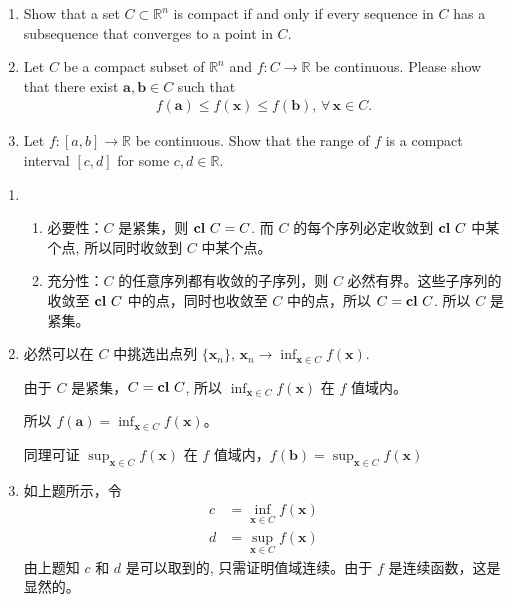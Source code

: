 \documentclass[11pt,letter,notitlepage]{article}
\theoremstyle{definition}
\DeclareMathOperator*{\cl}{\bf cl\,}
\begin{document}
\begin{exercise}
	\begin{enumerate}
		\item Show that a set $C \subset \mathbb{R}^n$ is compact if and only if every sequence in $C$ has a subsequence that converges to a point in $C$.
		\item Let $C$ be a compact subset of $\mathbb{R}^n$ and $f:C \rightarrow \mathbb{R}$ be continuous. Please show that there exist $\mathbf{a},\mathbf{b} \in C$ such that
		      \begin{align*}
			      f(\mathbf{a}) \leq f(\mathbf{x}) \leq f(\mathbf{b}),\,\forall\,\mathbf{x}\in C.
		      \end{align*}
		\item Let $f: \left[ a,b \right] \rightarrow\mathbb{R}$ be continuous. Show that the range of $f$ is a compact interval $\left[c,d \right]$ for some $c,d \in \mathbb{R}$.
	\end{enumerate}
\end{exercise}
\begin{solution}
	\begin{enumerate}
		\item \begin{enumerate}
			      \item 必要性：$C$ 是紧集，则 $\cl C=C$. 而 $C$ 的每个序列必定收敛到 $\cl C$ 中某个点, 所以同时收敛到 $C$ 中某个点。
			      \item 充分性：$C$ 的任意序列都有收敛的子序列，则 $C$ 必然有界。这些子序列的收敛至 $\cl C$ 中的点，同时也收敛至 $C$ 中的点，所以 $C=\cl C$. 所以 $C$ 是紧集。
		      \end{enumerate}
		\item 必然可以在 $C$ 中挑选出点列 $\{\mathbf{x}_n\}$, $\mathbf{x}_n\to\inf_{\mathbf{x}\in C} f(\mathbf{x})$.

		      由于 $C$ 是紧集，$C=\cl C$, 所以 $\inf_{\mathbf{x}\in C} f(\mathbf{x})$ 在 $f$ 值域内。

		      所以 $f(\mathbf{a})=\inf_{\mathbf{x}\in C} f(\mathbf{x})$。

		      同理可证 $\sup_{\mathbf{x}\in C} f(\mathbf{x})$ 在 $f$ 值域内，$f(\mathbf{b})=\sup_{\mathbf{x}\in C} f(\mathbf{x})$
		\item 如上题所示，令
		      $$\begin{aligned}
				      c & =\inf_{\mathbf{x}\in C} f(\mathbf{x}) \\
				      d & =\sup_{\mathbf{x}\in C} f(\mathbf{x})
			      \end{aligned}$$
		      由上题知 $c$ 和 $d$ 是可以取到的, 只需证明值域连续。由于 $f$ 是连续函数，这是显然的。
	\end{enumerate}

\end{solution}
\end{document}
